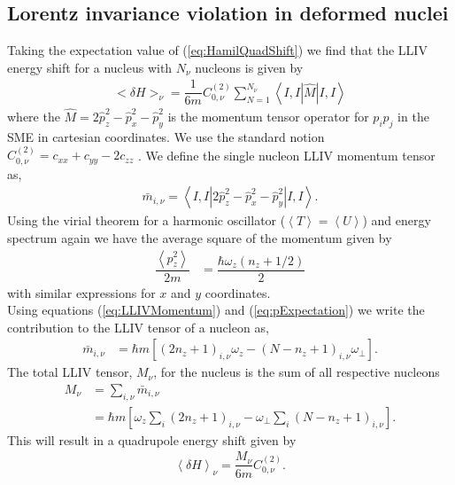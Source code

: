 \documentclass[8pt,a4paper, twoside]{report}
\begin{document}
\subsection{Lorentz invariance violation  in deformed nuclei}
Taking the expectation value of (\ref{eq:HamilQuadShift}) we find that the LLIV energy shift  for a nucleus with $N_{\nu}$ nucleons is given by 
\begin{align} \label{eq:MomentumEnergyShift}
<\delta H>_{\nu} = \dfrac{1}{6m}C_{0, \nu}^{(2)}\sum_{N=1}^{N_{\nu}}\left<I,I\left|\hat{M}\right|I,I\right> 
\end{align}
where the $\hat{M} = 2\hat{p}_z^2 - \hat{p}_x^2 - \hat{p}_y^2$ is the momentum tensor operator for $p_ip_j$ in the SME in cartesian coordinates. We use the standard notion $C_{0, \nu}^{(2)} = c_{xx} + c_{yy} -2c_{zz}$ \cite{Kostelecky1999}. We define the single nucleon LLIV momentum tensor as,
\begin{align} \label{eq:LLIVMomentum}
\bar{m}_{i, \nu} =  \left<I,I\left|2\hat{p}_z^2 - \hat{p}_x^2 - \hat{p}_y^2\right|I,I\right>.
\end{align}
Using the virial theorem for a harmonic oscillator ($\left<T\right>=\left<U\right>$) and energy spectrum again we have the average square of the momentum given by
\begin{align} 
\dfrac{\left<p_z^2\right>}{2m} &= \dfrac{\hbar\omega_z\left(n_z + 1/2\right)}{2} \label{eq:pExpectation}
\end{align}
with similar expressions for $x$ and $y$ coordinates. \\
\linebreak
Using equations (\ref{eq:LLIVMomentum}) and (\ref{eq:pExpectation}) we write the contribution to the LLIV tensor of a nucleon as,
\begin{align} \label{eq:MDimensionful}
\bar{m}_{i,\nu} &= \hbar m\left[\left(2n_z + 1\right)_{i,\nu}\omega_z - \left(N - n_z + 1\right)_{i,\nu}\omega_{\perp}\right].
\end{align}
The total LLIV tensor, $M_{\nu}$,  for the nucleus is the sum of all respective nucleons
\begin{align}
M_{\nu} &= \sum_{i,\nu} \bar{m}_{i,\nu} \nonumber \\
&= \hbar m\left[\omega_z\sum_{i}\left(2n_z + 1\right)_{i,\nu} - \omega_{\perp}\sum_{i}\left(N - n_z + 1\right)_{i,\nu}\right]. \label{eq:CollectiveQDim}
\end{align}
This will result in a quadrupole energy shift given by
\begin{align} \label{eq:LLIVEnergyShift}
\left<\delta H\right>_{\nu} = \dfrac{M_{\nu}}{6m} C_{0,\nu}^{(2)}.
\end{align}
\end{document}
